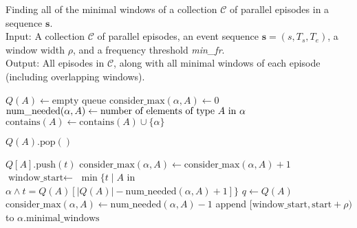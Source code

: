 \begin{algorithm}

\caption{Finding all of the minimal windows of a collection $ \mathcal{C} $ of parallel episodes in a sequence $ \boldsymbol{s} $. \\
Input: A collection $ \mathcal{C} $ of parallel episodes, an event sequence $ \boldsymbol{s} = (s, T_s, T_e) $, a window width $ \rho $, and a frequency threshold \textit{min\_fr}. \\
Output: All episodes in $ \mathcal{C} $, along with all minimal windows of each episode (including overlapping windows).}

\begin{algorithmic}[1]

    \State $ Q(A) \gets \text{empty queue} $
\EndFor
{}
        \State $ \text{consider\_max}(\alpha, A) \gets 0 $
        \State $ \text{num\_needed}(\alpha, A) \gets \text{number of elements of type $ A $ in $ \alpha $} $
        \State $ \text{contains}(A) \gets \text{contains}(A) \cup \{ \alpha \} $
    \EndFor
\EndFor

        \State $ Q(A) \text{.pop}() $
    \EndFor

        \State $ Q[A] \text{.push}(t) $ \label{alglin:rec-par-mwi:push-timestamp}
            \State $ \text{consider\_max}(\alpha, A) \gets \text{consider\_max}(\alpha, A) + 1 $
             \label{alglin:rec-par-mwi:check-min-window-satisfied}
                \State $ \text{window\_start} \gets $ \label{alglin:rec-par-mwi:find-window-start}
                \State \hspace{\algorithmicindent} $ \min\{ t \mid A $ in $ \alpha \wedge t = Q(A)[| Q(A) | - \text{num\_needed}(\alpha, A) + 1] \} $
                    $ q \gets Q(A) $
                        \State $ \text{consider\_max}(\alpha, A) \gets \text{num\_needed}(\alpha, A) - 1 $
                    \EndIf
                \EndFor
                \State append $ [\text{window\_start}, \text{start} + \rho) $ to $ \alpha \text{.minimal\_windows} $
            \EndIf
        \EndFor
    \EndFor
\EndFor

\end{algorithmic}

\label{alg:rec-par-mwi}
\end{algorithm}

